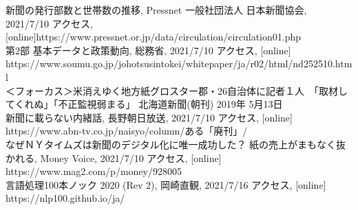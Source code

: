 \documentclass[openany, 11pt,papersize,dvipdfm]{jsbook}
\begin{document}
\tableofcontents%

\mainmatter%








\begin{appendix}


\end{appendix}


\begin{thebibliography}{9}
  新聞の発行部数と世帯数の推移, Pressnet 一般社団法人 日本新聞協会,  2021/7/10 アクセス, [online]https://www.pressnet.or.jp/data/circulation/circulation01.php\\
  第2部 基本データと政策動向, 総務省, 2021/7/10 アクセス, [online]  https://www.soumu.go.jp/johotsusintokei/whitepaper/ja/r02/html/nd252510.html\\
  ＜フォーカス＞米消えゆく地方紙グロスター郡・26自治体に記者１人　「取材してくれぬ」「不正監視弱まる」 北海道新聞(朝刊) 2019年 5月13日\\
  新聞に載らない内緒話, 長野朝日放送, 2021/7/10 アクセス, [online] https://www.abn-tv.co.jp/naisyo/column/ある「廃刊」/\\
  なぜＮＹタイムズは新聞のデジタル化に唯一成功した？ 紙の売上がまもなく抜かれる, Money Voice, 2021/7/10 アクセス, [online] https://www.mag2.com/p/money/928005\\
  言語処理100本ノック 2020 (Rev 2), 岡崎直観, 2021/7/16 アクセス, [online] https://nlp100.github.io/ja/
\end{thebibliography}
\end{document}
